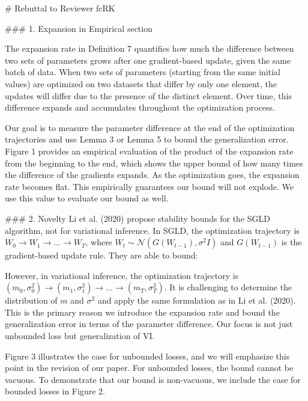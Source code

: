 \documentclass{article}
\begin{document}
\begin{markdown}
# Rebuttal to Reviewer fcRK

### 1. Expansion in Empirical section

The expansion rate in Definition 7 quantifies how much the difference between two sets of parameters grows after one gradient-based update, given the same batch of data. When two sets of parameters (starting from the same initial values) are optimized on two datasets that differ by only one element, the updates will differ due to the presence of the distinct element. Over time, this difference expands and accumulates throughout the optimization process.

Our goal is to measure the parameter difference at the end of the optimization trajectories and use Lemma 3 or Lemma 5 to bound the generalization error. Figure 1 provides an empirical evaluation of the product of the expansion rate from the beginning to the end, which shows the upper bound of how many times the difference of the gradients expands. As the optimization goes, the expansion rate becomes flat. This empirically guarantees our bound will not explode. We use this value to evaluate our bound as well.


### 2. Novelty
Li et al. (2020) propose stability bounds for the SGLD algorithm, not for variational inference. In SGLD, the optimization trajectory is $W_0 \rightarrow W_1 \rightarrow \dots \rightarrow W_T$, where $W_t \sim \mathcal{N}(G(W_{t-1}), \sigma^2 I)$ and $G(W_{t-1})$ is the gradient-based update rule. They are able to bound:  

However, in variational inference, the optimization trajectory is $(m_0, \sigma_0^2) \rightarrow (m_1, \sigma_1^2) \rightarrow \dots \rightarrow (m_T, \sigma_T^2)$. It is challenging to determine the distribution of $m$ and $\sigma^2$ and apply the same formulation as in Li et al. (2020). This is the primary reason we introduce the expansion rate and bound the generalization error in terms of the parameter difference. Our focus is not just unbounded loss but generalization of VI.

Figure 3 illustrates the case for unbounded losses, and we will emphasize this point in the revision of our paper. For unbounded losses, the bound cannot be vacuous. To demonstrate that our bound is non-vacuous, we include the case for bounded losses in Figure 2.


\end{markdown}
\end{document}
